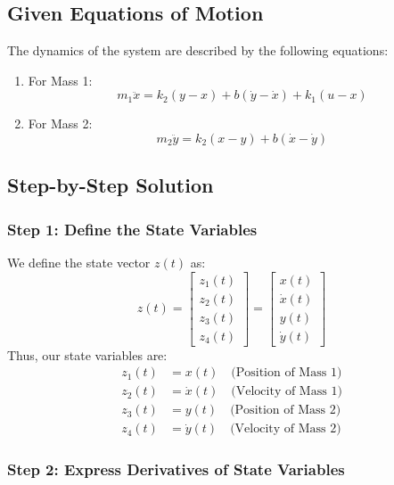 \documentclass{article}
\begin{document}
\subsection*{Given Equations of Motion}

The dynamics of the system are described by the following equations:

\begin{enumerate}
    \item For Mass 1:
    \[
    m_1 \ddot{x} = k_2 (y - x) + b (\dot{y} - \dot{x}) + k_1 (u - x)
    \]
    \item For Mass 2:
    \[
    m_2 \ddot{y} = k_2 (x - y) + b (\dot{x} - \dot{y})
    \]
\end{enumerate}


\subsection*{Step-by-Step Solution}

\subsubsection*{Step 1: Define the State Variables}

We define the state vector \( z(t) \) as:
\[
z(t) = \begin{bmatrix}
z_1(t) \\
z_2(t) \\
z_3(t) \\
z_4(t)
\end{bmatrix}
=
\begin{bmatrix}
x(t) \\
\dot{x}(t) \\
y(t) \\
\dot{y}(t)
\end{bmatrix}
\]
Thus, our state variables are:
\begin{align*}
z_1(t) &= x(t) \quad \text{(Position of Mass 1)} \\
z_2(t) &= \dot{x}(t) \quad \text{(Velocity of Mass 1)} \\
z_3(t) &= y(t) \quad \text{(Position of Mass 2)} \\
z_4(t) &= \dot{y}(t) \quad \text{(Velocity of Mass 2)}
\end{align*}

\subsubsection*{Step 2: Express Derivatives of State Variables}
\end{document}
